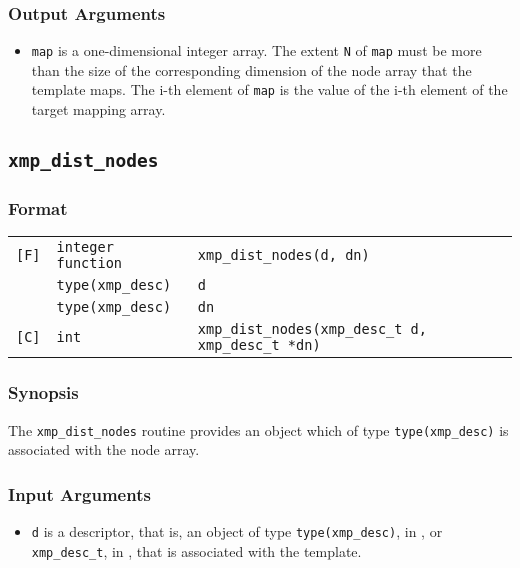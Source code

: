 \subsubsection*{Output Arguments}
\begin{itemize}
 \item {\tt map} is a one-dimensional integer array. The extent {\tt N} of {\tt map} must be more than the size of the corresponding dimension of the node array that the template maps.
   The i-th element of {\tt map} is the value of the i-th element of the target mapping array. 
\end{itemize}


\subsection{\tt xmp\_dist\_nodes}

\subsubsection*{Format}

\begin{tabular}{lll}

\verb![F]!& {\tt integer function}& {\tt xmp\_dist\_nodes(d, dn)}\\
          & {\tt type(xmp\_desc)} & {\tt d}\\
          & {\tt type(xmp\_desc)} & {\tt dn}\\

\verb![C]!&  {\tt int}& {\tt xmp\_dist\_nodes(xmp\_desc\_t d, xmp\_desc\_t *dn)}\\

\end{tabular}

\subsubsection*{Synopsis}

The {\tt xmp\_dist\_nodes} routine provides an object which of type {\tt type(xmp\_desc)} is associated with the node array.


\subsubsection*{Input Arguments}
\begin{itemize}
 \item {\tt d} is a descriptor, that is, an object of type 
       {\tt type(xmp\_desc)}, in {\XMPF}, or {\tt xmp\_desc\_t},
       in {\XMPC}, that is associated with the template.
\end{itemize}

